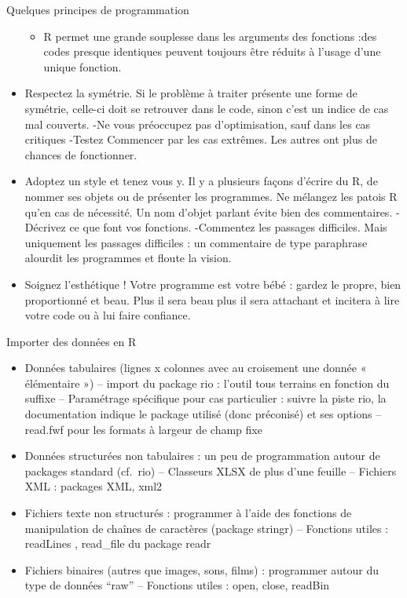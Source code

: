 \documentclass[
  ignorenonframetext,
]{beamer}
\providecommand{\tightlist}{%
  \setlength{\itemsep}{0pt}\setlength{\parskip}{0pt}}
\begin{document}
\begin{frame}{Quelques principes de programmation}
\begin{itemize}
  \begin{itemize}
  \tightlist
  \item
    R permet une grande souplesse dans les arguments des fonctions :des
    codes presque identiques peuvent toujours être réduits à l'usage
    d'une unique fonction.
  \end{itemize}
\item
  Respectez la symétrie. Si le problème à traiter présente une forme de
  symétrie, celle-ci doit se retrouver dans le code, sinon c'est un
  indice de cas mal couverts. -Ne vous préoccupez pas d'optimisation,
  sauf dans les cas critiques -Testez Commencer par les cas extrêmes.
  Les autres ont plus de chances de fonctionner.
\item
  Adoptez un style et tenez vous y. Il y a plusieurs façons d'écrire du
  R, de nommer ses objets ou de présenter les programmes. Ne mélangez
  les patois R qu'en cas de nécessité. Un nom d'objet parlant évite bien
  des commentaires. -Décrivez ce que font vos fonctions. -Commentez les
  passages difficiles. Mais uniquement les passages difficiles : un
  commentaire de type paraphrase alourdit les programmes et floute la
  vision.
\item
  Soignez l'esthétique ! Votre programme est votre bébé : gardez le
  propre, bien proportionné et beau. Plus il sera beau plus il sera
  attachant et incitera à lire votre code ou à lui faire confiance.
\end{itemize}
\end{frame}

\begin{frame}{Importer des données en R}
\protect\hypertarget{importer-des-donnuxe9es-en-r}{}
\begin{itemize}
\tightlist
\item
  Données tabulaires (lignes x colonnes avec au croisement une donnée «
  élémentaire ») -- import du package rio : l'outil tous terrains en
  fonction du suffixe -- Paramétrage spécifique pour cas particulier :
  suivre la piste rio, la documentation indique le package utilisé (donc
  préconisé) et ses options -- read.fwf pour les formats à largeur de
  champ fixe
\item
  Données structurées non tabulaires : un peu de programmation autour de
  packages standard (cf.~rio) -- Classeurs XLSX de plus d'une feuille --
  Fichiers XML : packages XML, xml2
\item
  Fichiers texte non structurés : programmer à l'aide des fonctions de
  manipulation de chaînes de caractères (package stringr) -- Fonctions
  utiles : readLines , read\_file du package readr
\item
  Fichiers binaires (autres que images, sons, films) : programmer autour
  du type de données ``raw'' -- Fonctions utiles : open, close, readBin
\end{itemize}
\end{frame}
\end{document}
